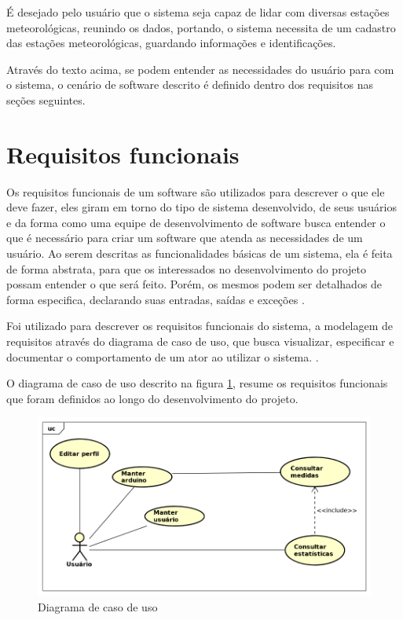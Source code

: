 É desejado pelo usuário que o sistema seja capaz de lidar com diversas estações meteorológicas, reunindo os dados, portando, o sistema necessita de um cadastro das estações meteorológicas, guardando informações e identificações.

Através do texto acima, se podem entender as necessidades do usuário para com o sistema, o cenário de software descrito é definido dentro dos requisitos nas seções seguintes.

\section{Requisitos funcionais}

Os requisitos funcionais de um software são utilizados para descrever o que ele deve fazer, eles giram em torno do tipo de sistema desenvolvido, de seus usuários e da forma como uma equipe de desenvolvimento de software busca entender o que é necessário para criar um software que atenda as necessidades de um usuário. Ao serem descritas as funcionalidades básicas de um sistema, ela é feita de forma abstrata, para que os interessados no desenvolvimento do projeto possam entender o que será feito. Porém, os mesmos podem ser detalhados de forma especifica, declarando suas entradas, saídas e exceções \cite{engenharia_software_sommerville}.

Foi utilizado para descrever os requisitos funcionais do sistema, a modelagem de requisitos através do diagrama de caso de uso, que busca visualizar, especificar e documentar o comportamento de um ator ao utilizar o sistema. \cite{uml_pratica}.

O diagrama de caso de uso descrito na figura \ref{fig:figure_diagrama_caso_uso}, resume os requisitos funcionais que foram definidos ao longo do desenvolvimento do projeto.

\begin{figure}[H]
    \centering
    \caption{Diagrama de caso de uso} \label{fig:figure_diagrama_caso_uso}
    \includegraphics[scale=0.45]{diagrams/caso_de_uso.png}
    \hfill
{}
\end{figure}

